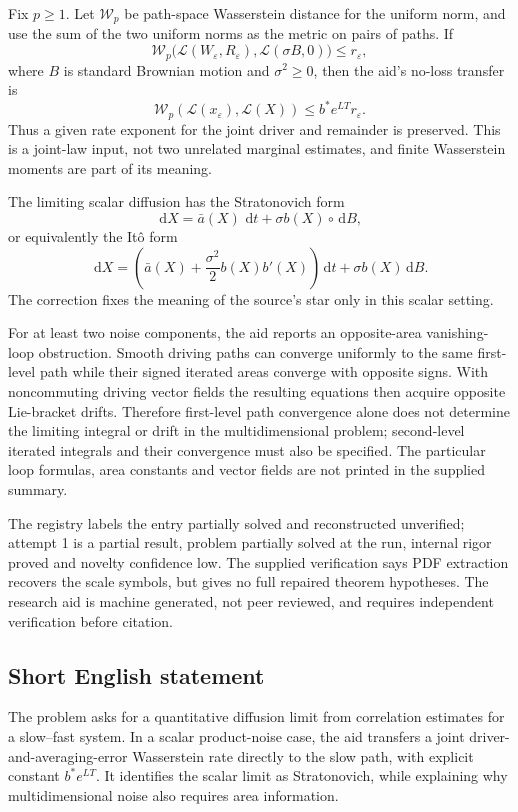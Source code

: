 \documentclass[11pt]{article}
\newcommand{\dd}{\,\mathrm{d}}
\begin{document}
Fix \(p\ge1\). Let \(\mathcal W_p\) be path-space Wasserstein distance for the uniform norm, and use the sum of the two uniform norms as the metric on pairs of paths. If
\[
\mathcal W_p\bigl(\mathcal L(W_\varepsilon,R_\varepsilon),\mathcal L(\sigma B,0)\bigr)\le r_\varepsilon,
\]
where \(B\) is standard Brownian motion and \(\sigma^2\ge0\), then the aid's no-loss transfer is
\[
\mathcal W_p(\mathcal L(x_\varepsilon),\mathcal L(X))\le b^*e^{LT}r_\varepsilon.
\]
Thus a given rate exponent for the joint driver and remainder is preserved. This is a joint-law input, not two unrelated marginal estimates, and finite Wasserstein moments are part of its meaning.

The limiting scalar diffusion has the Stratonovich form
\[
\dd X=\bar a(X)\,\dd t+\sigma b(X)\circ\dd B,
\]
or equivalently the It\^o form
\[
\dd X=\left(\bar a(X)+\frac{\sigma^2}{2}b(X)b'(X)\right)\dd t+\sigma b(X)\dd B.
\]
The correction fixes the meaning of the source's star only in this scalar setting.

For at least two noise components, the aid reports an opposite-area vanishing-loop obstruction. Smooth driving paths can converge uniformly to the same first-level path while their signed iterated areas converge with opposite signs. With noncommuting driving vector fields the resulting equations then acquire opposite Lie-bracket drifts. Therefore first-level path convergence alone does not determine the limiting integral or drift in the multidimensional problem; second-level iterated integrals and their convergence must also be specified. The particular loop formulas, area constants and vector fields are not printed in the supplied summary.

The registry labels the entry partially solved and reconstructed unverified; attempt 1 is a partial result, problem partially solved at the run, internal rigor proved and novelty confidence low. The supplied verification says PDF extraction recovers the scale symbols, but gives no full repaired theorem hypotheses. The research aid is machine generated, not peer reviewed, and requires independent verification before citation.
\subsection{Short English statement}
The problem asks for a quantitative diffusion limit from correlation estimates for a slow--fast system. In a scalar product-noise case, the aid transfers a joint driver-and-averaging-error Wasserstein rate directly to the slow path, with explicit constant \(b^*e^{LT}\). It identifies the scalar limit as Stratonovich, while explaining why multidimensional noise also requires area information.
\end{document}
